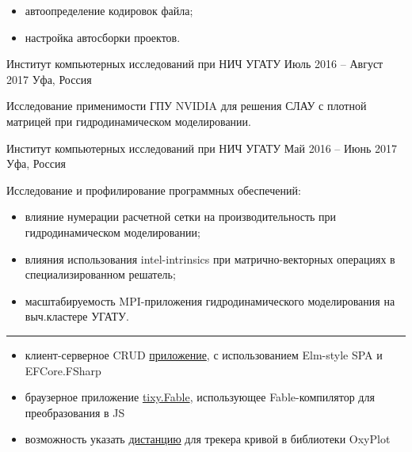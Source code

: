 \documentclass[10pt,a4paper,ragged2e,withhyper]{altacv}
\begin{document}
\begin{paracol}{2}
\begin{itemize}
  \item автоопределение кодировок файла;
  \smallskip

  \item настройка автосборки проектов.

\end{itemize}

\divider

{Институт компьютерных исследований при НИЧ УГАТУ}
{Июль 2016 -- Август 2017}
{Уфа, Россия}

Исследование применимости ГПУ NVIDIA для решения СЛАУ с плотной матрицей при гидродинамическом моделировании.

\divider

{Институт компьютерных исследований при НИЧ УГАТУ}
{Май 2016 -- Июнь 2017}
{Уфа, Россия}

Исследование и профилирование программных обеспечений:

\begin{itemize}

  \item влияние нумерации расчетной сетки на производительность при гидродинамическом моделировании;
  \smallskip

  \item влияния использования intel-intrinsics при матрично-векторных операциях в специализированном решатель;
  \smallskip

  \item масштабируемость MPI-приложения гидродинамического моделирования на выч.кластере УГАТУ.

\end{itemize}

{\color{headingrule}\rule{\linewidth}{1pt}\par}\medskip


\smallskip

\begin{itemize}

  \item клиент-серверное CRUD
  \href{https://github.com/rstm-sf/ClientServerCRUD}{приложение},
  с использованием Elm-style SPA и EFCore.FSharp
  \smallskip

  \item браузерное приложение
  \href{https://github.com/rstm-sf/tixy.Fable}{tixy.Fable},
  использующее Fable-компилятор для преобразования в JS
  \smallskip

  \item возможность указать
  \href{https://github.com/oxyplot/oxyplot/pull/1736}{дистанцию}
  для трекера кривой в библиотеки OxyPlot
  \smallskip


\end{itemize}
\end{paracol}
\end{document}
